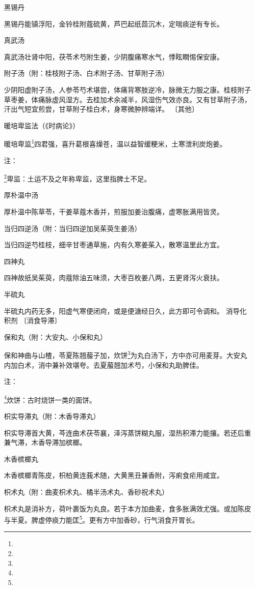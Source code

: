 \documentclass[a4paper,12pt,UTF8,twoside]{ctexbook}
\begin{document}
黑锡丹

黑锡丹能镇浮阳，金铃桂附蔻硫黄，芦巴起纸茴沉木，定喘痰逆有专长。

真武汤

真武汤壮肾中阳，茯苓术芍附生姜，少阴腹痛寒水气，悸眩瞤惕保安康。

附子汤（附：桂枝附子汤、白术附子汤、甘草附子汤）

少阴阳虚附子汤，人参苓芍术堪尝，体痛背寒肢逆冷，脉微无力服之康。桂枝附子草枣姜，体痛脉虚风湿方。去桂加术余减半，风湿伤气效亦良。又有甘草附子汤，汗出气短宜煎尝，甘草附子桂白术，身寒微肿辨端详。
〔其他〕

暖培卑监法（《时病论》）

暖培卑监\footnote{}四君强，喜升葛根喜燥苍，温以益智缓粳米，土寒泄利炭炮姜。

注：

\footnote{}卑监：土运不及之年称卑监，这里指脾土不足。

厚朴温中汤

厚朴温中陈草苓，干姜草蔻木香并，煎服加姜治腹痛，虚寒胀满用皆灵。

当归四逆汤（附：当归四逆加吴茱萸生姜汤）

当归四逆芍桂枝，细辛甘枣通草施，内有久寒姜茱入，散寒温里此方宜。

四神丸

四神故纸吴茱萸，肉蔻除油五味须，大枣百枚姜八两，五更肾泻火衰扶。

半硫丸

半硫丸内药无多，阳虚气寒便闭疴，或是便溏经日久，此方即可令调和。
消导化积剂
〔消食导滞〕

保和丸（附：大安丸、小保和丸）

保和神曲与山楂，苓夏陈翘菔子加，炊饼\footnote{}为丸白汤下，方中亦可用麦芽。大安丸内加白术，消中兼补效堪夸。去夏菔翘加术芍，小保和丸助脾佳。

注：

\footnote{}炊饼：古时烧饼一类的面饼。

枳实导滞丸（附：木香导滞丸）

枳实导滞首大黄，芩连曲术茯苓襄，泽泻蒸饼糊丸服，湿热积滞力能攘。若还后重兼气滞，木香导滞加槟榔。

木香槟榔丸

木香槟榔青陈皮，枳柏黄连莪术随，大黄黑丑兼香附，泻痢食疟用咸宜。

枳术丸（附：曲麦枳术丸、橘半汤术丸、香砂祝术丸）

枳术丸是消补方，荷叶裹饭为丸良。若于本方加曲麦，食多胀满效尤强。或加陈皮与半夏。脾虚停痰力能匡\footnote{}。更有方中加香砂，行气消食开胃长。
\end{document}
